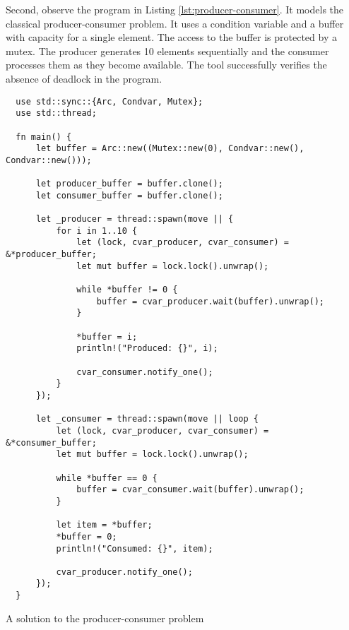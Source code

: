 Second, observe the program in Listing \ref{lst:producer-consumer}.
It models the classical producer-consumer problem.
It uses a condition variable and a buffer with capacity for a single element.
The access to the buffer is protected by a mutex.
The producer generates 10 elements sequentially and
the consumer processes them as they become available.
The tool successfully verifies the absence of deadlock in the program.

\begin{listing}[!htbp]
    \begin{verbatim}
  use std::sync::{Arc, Condvar, Mutex};
  use std::thread;
  
  fn main() {
      let buffer = Arc::new((Mutex::new(0), Condvar::new(), Condvar::new()));
  
      let producer_buffer = buffer.clone();
      let consumer_buffer = buffer.clone();
  
      let _producer = thread::spawn(move || {
          for i in 1..10 {
              let (lock, cvar_producer, cvar_consumer) = &*producer_buffer;
              let mut buffer = lock.lock().unwrap();
  
              while *buffer != 0 {
                  buffer = cvar_producer.wait(buffer).unwrap();
              }
  
              *buffer = i;
              println!("Produced: {}", i);
  
              cvar_consumer.notify_one();
          }
      });
  
      let _consumer = thread::spawn(move || loop {
          let (lock, cvar_producer, cvar_consumer) = &*consumer_buffer;
          let mut buffer = lock.lock().unwrap();
  
          while *buffer == 0 {
              buffer = cvar_consumer.wait(buffer).unwrap();
          }
  
          let item = *buffer;
          *buffer = 0;
          println!("Consumed: {}", item);
  
          cvar_producer.notify_one();
      });
  }
  \end{verbatim}
    \caption{A solution to the producer-consumer problem}
    \label{lst:producer-consumer}
\end{listing}